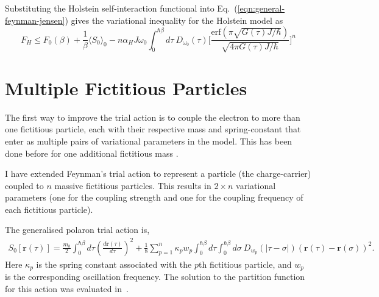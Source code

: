 Substituting the Holstein self-interaction functional into Eq.~(\ref{eqn:general-feynman-jensen}) gives the variational inequality for the Holstein model as 
\begin{equation}
        F_H \leq F_0(\beta) + \frac{1}{\beta} \langle S_0 \rangle_0 - n \alpha_H J \omega_0 \int_0^{\hbar\beta} d\tau\ D_{\omega_0}(\tau) \Biggl[\frac{\text{erf}(\pi \sqrt{G(\tau)J/\hbar})}{\sqrt{4\pi G(\tau)J/\hbar}}\Biggr]^n
\end{equation}

\section{Multiple Fictitious Particles}
\label{sec:chap-fourth-first}

The first way to improve the trial action is to couple the electron to more than one fictitious particle, each with their respective mass and spring-constant that enter as multiple pairs of variational parameters in the model. This has been done before for one additional fictitious mass \cite{abe_improvement_1971}. 

I have extended Feynman's trial action to represent a particle (the charge-carrier) coupled to $n$ massive fictitious particles. This results in $2 \times n$ variational parameters (one for the coupling strength and one for the coupling frequency of each fictitious particle).

The generalised polaron trial action is,
\begin{equation} \label{eqn:multi_trial_action}
    \begin{gathered}
        S_{0}[\mathbf{r}(\tau)] =
        \frac{m_b}{2}\int^{\hbar \beta}_0 d\tau \left(\frac{d\mathbf{r}(\tau)}{d\tau}\right)^2 +
        \frac{1}{8} \sum_{p = 1}^n \kappa_{p} w_{p} \int^{\hbar\beta}_0 d\tau \int^{\hbar\beta}_0 d\sigma\ D_{w_p}(|\tau - \sigma|) (\mathbf{r}(\tau) - \mathbf{r}(\sigma))^{2} .
    \end{gathered}
\end{equation}
Here $\kappa_{p}$ is the spring constant associated with the $p$th fictitious particle, and $w_{p}$ is the corresponding oscillation frequency. The solution to the partition function for this action was evaluated in~\cite{poulter_complete_1992}.

